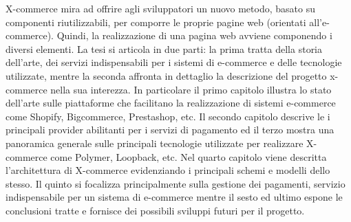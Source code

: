 \newline
X-commerce mira ad offrire agli sviluppatori un nuovo metodo, basato su componenti riutilizzabili, per comporre le proprie pagine web (orientati all’e-commerce). Quindi, la realizzazione di una pagina web avviene componendo i diversi elementi.
\newline
La tesi si articola in due parti: la prima tratta della storia dell'arte, dei servizi indispensabili per i sistemi di e-commerce e delle tecnologie utilizzate, mentre la seconda affronta in dettaglio la descrizione del progetto x-commerce nella sua interezza.
In particolare il primo capitolo illustra lo stato dell’arte sulle piattaforme che facilitano la realizzazione di sistemi e-commerce come Shopify, Bigcommerce, Prestashop, etc.
Il secondo capitolo descrive le i principali provider abilitanti per i servizi di pagamento ed il terzo mostra una panoramica generale sulle principali tecnologie utilizzate per realizzare X-commerce come Polymer, Loopback, etc.
\newline
Nel quarto capitolo viene descritta l'architettura di X-commerce evidenziando i principali schemi e modelli dello stesso.
\newline
Il quinto si focalizza principalmente sulla gestione dei pagamenti, servizio indispensabile per un sistema di e-commerce mentre il sesto ed ultimo espone le conclusioni tratte e fornisce dei possibili sviluppi futuri per il progetto.
